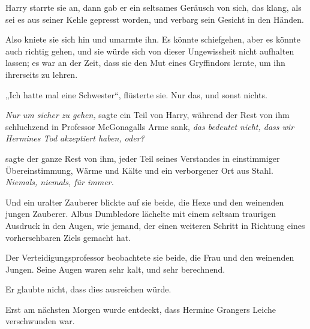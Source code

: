 Harry starrte sie an, dann gab er ein seltsames Geräusch von sich, das klang, als sei es aus seiner Kehle gepresst worden, und verbarg sein Gesicht in den Händen.

Also kniete sie sich hin und umarmte ihn. Es könnte schiefgehen, aber es könnte auch richtig gehen, und sie würde sich von dieser Ungewissheit nicht aufhalten lassen; es war an der Zeit, dass sie den Mut eines Gryffindors lernte, um ihn ihrerseits zu lehren.

„Ich hatte mal eine Schwester“, flüsterte sie. Nur das, und sonst nichts.

\later

\emph{Nur um sicher zu gehen,} sagte ein Teil von Harry, während der Rest von ihm schluchzend in Professor McGonagalls Arme sank, \emph{das bedeutet nicht, dass wir Hermines Tod akzeptiert haben, oder?}

\emph{} sagte der ganze Rest von ihm, jeder Teil seines Verstandes in einstimmiger Übereinstimmung, Wärme und Kälte und ein verborgener Ort aus Stahl.
\emph{Niemals, niemals, für immer.}

\later

Und ein uralter Zauberer blickte auf sie beide, die Hexe und den weinenden jungen Zauberer. Albus Dumbledore lächelte mit einem seltsam traurigen Ausdruck in den Augen, wie jemand, der einen weiteren Schritt in Richtung eines vorhersehbaren Ziels gemacht hat.

\later

Der Verteidigungsprofessor beobachtete sie beide, die Frau und den weinenden Jungen. Seine Augen waren sehr kalt, und sehr berechnend.

Er glaubte nicht, dass dies ausreichen würde.

\later

Erst am nächsten Morgen wurde entdeckt, dass Hermine Grangers Leiche verschwunden war.

